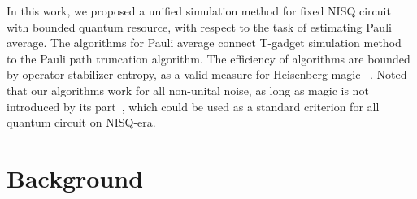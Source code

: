\documentclass[aps,%
twocolumn,%
floatfix,%
pra,%
amsfonts,%
longbibliography,%
groupedaddress,%
superscriptaddress]{revtex4-2}%
\newcommand{\1}{\mathbbm{1}}
\begin{document}
In this work, we proposed a unified simulation method for fixed NISQ circuit with bounded quantum resource, with respect to the task of estimating Pauli average.
The algorithms for Pauli average connect T-gadget simulation method~\cite{bravyi2019simulation} to the Pauli path truncation algorithm. The efficiency of algorithms are bounded by operator stabilizer entropy, as a valid measure for Heisenberg magic~\cite{dowling2024magic} .  
Noted that our algorithms work for all non-unital noise, as long as magic is not introduced by its part~\cite{turkeshi2024coherent}, which could be used as a standard criterion for all quantum circuit on NISQ-era. 


\section{Background}
\end{document}
